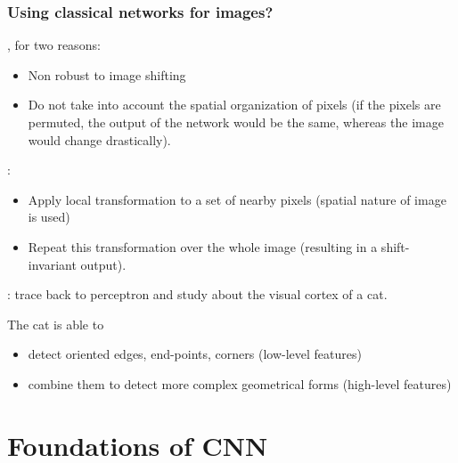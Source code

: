 \begin{frame}
	\frametitle{Using classical networks for images?}
	
, for two reasons: 
	\begin{itemize}
		\item Non robust to image shifting 
		\item Do not take into account the spatial organization of pixels (if the pixels are permuted, the output of the network would be the same, whereas the image would change drastically).
	\end{itemize}

\medskip

: 
\begin{itemize}
	\item Apply local transformation to a set of nearby pixels (spatial nature of image is used)
	\item Repeat this transformation over the whole image (resulting in a shift-invariant output).
\end{itemize} 

\medskip

: trace back to perceptron and study about the visual cortex of a cat. 

The cat is able to
\begin{itemize}
	\item detect oriented edges, end-points, corners (low-level features)
	\item combine them to detect more complex geometrical forms (high-level features)
\end{itemize} 



\end{frame}


\section{Foundations of CNN}




